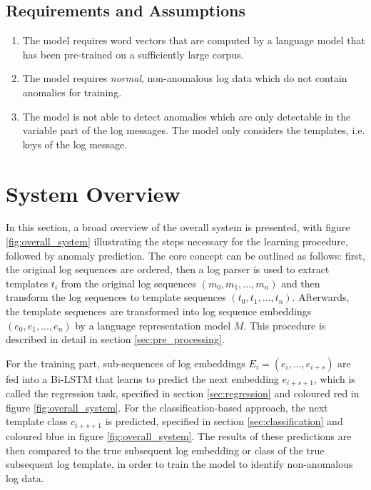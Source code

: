 \subsection{Requirements and Assumptions \label{sec:requirements_and_assumptions}}
\begin{enumerate}
	\item The model requires word vectors that are computed by a language model that has been pre-trained on a sufficiently large corpus.
	\item The model requires \textit{normal}, non-anomalous log data which do not contain anomalies for training.
	\item The model is not able to detect anomalies which are only detectable in the variable part of the log messages. The model only considers the templates, i.e. keys of the log message.
\end{enumerate}



\section{System Overview \label{sec:overall_system}}
In this section, a broad overview of the overall system is presented, with figure \ref{fig:overall_system} illustrating the steps necessary for the learning procedure, followed by anomaly prediction. 
The core concept can be outlined as follows: first, the original log sequences are ordered, then a log parser is used to extract templates $t_i$ from the original log sequences $(m_0, m_1, ..., m_n)$ and then transform the log sequences to template sequences $(t_0, t_1, ..., t_n)$. Afterwards, the template sequences are transformed into log sequence embeddings $(e_0, e_1, ..., e_n)$ by a language representation model $M$. This procedure is described in detail in section \ref{sec:pre_processing}.

For the training part, sub-sequences of log embeddings $E_i=(e_i,...,e_{i+s})$ are fed into a Bi-LSTM that learns to predict the next embedding $e_{i+s+1}$, which is called the regression task, specified in section \ref{sec:regression} and coloured red in figure \ref{fig:overall_system}. For the classification-based approach, the next template class $c_{i+s+1}$ is predicted, specified in section \ref{sec:classification} and coloured blue in figure \ref{fig:overall_system}. The results of these predictions are then compared to the true subsequent log embedding or class of the true subsequent log template, in order to train the model to identify non-anomalous log data.

